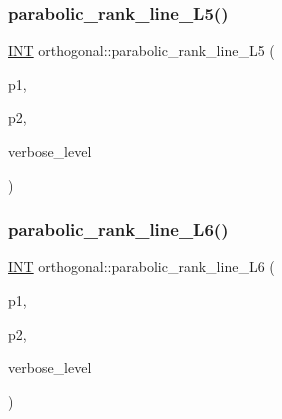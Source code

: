 \subsubsection{\texorpdfstring{parabolic\+\_\+rank\+\_\+line\+\_\+\+L5()}{parabolic\_rank\_line\_L5()}}
{\footnotesize\ttfamily \mbox{\hyperlink{galois_8h_a09fddde158a3a20bd2dcadb609de11dc}{I\+NT}} orthogonal\+::parabolic\+\_\+rank\+\_\+line\+\_\+\+L5 (\begin{DoxyParamCaption}\item[{\mbox{\hyperlink{galois_8h_a09fddde158a3a20bd2dcadb609de11dc}{I\+NT}}}]{p1,  }\item[{\mbox{\hyperlink{galois_8h_a09fddde158a3a20bd2dcadb609de11dc}{I\+NT}}}]{p2,  }\item[{\mbox{\hyperlink{galois_8h_a09fddde158a3a20bd2dcadb609de11dc}{I\+NT}}}]{verbose\+\_\+level }\end{DoxyParamCaption})}

\mbox{\label{classorthogonal_ab242f864cc2a012dee7c379649d2e566}} 
\subsubsection{\texorpdfstring{parabolic\+\_\+rank\+\_\+line\+\_\+\+L6()}{parabolic\_rank\_line\_L6()}}
{\footnotesize\ttfamily \mbox{\hyperlink{galois_8h_a09fddde158a3a20bd2dcadb609de11dc}{I\+NT}} orthogonal\+::parabolic\+\_\+rank\+\_\+line\+\_\+\+L6 (\begin{DoxyParamCaption}\item[{\mbox{\hyperlink{galois_8h_a09fddde158a3a20bd2dcadb609de11dc}{I\+NT}}}]{p1,  }\item[{\mbox{\hyperlink{galois_8h_a09fddde158a3a20bd2dcadb609de11dc}{I\+NT}}}]{p2,  }\item[{\mbox{\hyperlink{galois_8h_a09fddde158a3a20bd2dcadb609de11dc}{I\+NT}}}]{verbose\+\_\+level }\end{DoxyParamCaption})}

\mbox{\label{classorthogonal_ac38fe609d558cb7b16d92b7eb606c6f1}} 
